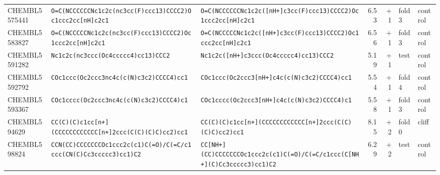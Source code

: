 \begin{longtable}{l p{4.4cm} p{4.4cm} r r l l}
CHEMBL5575441 & \texttt{O=\allowbreak{}C(\allowbreak{}NCCCCCCNc1c2c(\allowbreak{}nc3cc(\allowbreak{}F)\allowbreak{}ccc13)\allowbreak{}CCCC2)\allowbreak{}Oc1ccc2cc[nH]\allowbreak{}c2c1} & \texttt{O=\allowbreak{}C(\allowbreak{}NCCCCCCNc1c2c(\allowbreak{}[nH+]\allowbreak{}c3cc(\allowbreak{}F)\allowbreak{}ccc13)\allowbreak{}CCCC2)\allowbreak{}Oc1ccc2cc[nH]\allowbreak{}c2c1} & 6.53 & +1 & fold 3 & control \\
CHEMBL5583827 & \texttt{O=\allowbreak{}C(\allowbreak{}NCCCCCNc1c2c(\allowbreak{}nc3cc(\allowbreak{}F)\allowbreak{}ccc13)\allowbreak{}CCCC2)\allowbreak{}Oc1ccc2cc[nH]\allowbreak{}c2c1} & \texttt{O=\allowbreak{}C(\allowbreak{}NCCCCCNc1c2c(\allowbreak{}[nH+]\allowbreak{}c3cc(\allowbreak{}F)\allowbreak{}ccc13)\allowbreak{}CCCC2)\allowbreak{}Oc1ccc2cc[nH]\allowbreak{}c2c1} & 6.56 & +1 & fold 3 & control \\
CHEMBL5591282 & \texttt{Nc1c2c(\allowbreak{}nc3ccc(\allowbreak{}Oc4ccccc4)\allowbreak{}cc13)\allowbreak{}CCC2} & \texttt{Nc1c2c(\allowbreak{}[nH+]\allowbreak{}c3ccc(\allowbreak{}Oc4ccccc4)\allowbreak{}cc13)\allowbreak{}CCC2} & 5.19 & +1 & test & control \\
CHEMBL5592792 & \texttt{COc1ccc(\allowbreak{}Oc2ccc3nc4c(\allowbreak{}c(\allowbreak{}N)\allowbreak{}c3c2)\allowbreak{}CCCC4)\allowbreak{}cc1} & \texttt{COc1ccc(\allowbreak{}Oc2ccc3[nH+]\allowbreak{}c4c(\allowbreak{}c(\allowbreak{}N)\allowbreak{}c3c2)\allowbreak{}CCCC4)\allowbreak{}cc1} & 5.54 & +1 & fold 4 & control \\
CHEMBL5593367 & \texttt{COc1cccc(\allowbreak{}Oc2ccc3nc4c(\allowbreak{}c(\allowbreak{}N)\allowbreak{}c3c2)\allowbreak{}CCCC4)\allowbreak{}c1} & \texttt{COc1cccc(\allowbreak{}Oc2ccc3[nH+]\allowbreak{}c4c(\allowbreak{}c(\allowbreak{}N)\allowbreak{}c3c2)\allowbreak{}CCCC4)\allowbreak{}c1} & 5.58 & +1 & fold 3 & control \\
CHEMBL594629 & \texttt{CC(\allowbreak{}C)\allowbreak{}(\allowbreak{}C)\allowbreak{}c1cc[n+]\allowbreak{}(\allowbreak{}CCCCCCCCCCCC[n+]\allowbreak{}2ccc(\allowbreak{}C(\allowbreak{}C)\allowbreak{}(\allowbreak{}C)\allowbreak{}C)\allowbreak{}cc2)\allowbreak{}cc1} & \texttt{CC(\allowbreak{}C)\allowbreak{}(\allowbreak{}C)\allowbreak{}c1cc[n+]\allowbreak{}(\allowbreak{}CCCCCCCCCCCC[n+]\allowbreak{}2ccc(\allowbreak{}C(\allowbreak{}C)\allowbreak{}(\allowbreak{}C)\allowbreak{}C)\allowbreak{}cc2)\allowbreak{}cc1} & 8.15 & +2 & fold 0 & cliff \\
CHEMBL598824 & \texttt{CCN(\allowbreak{}CC)\allowbreak{}CCCCCCCOc1ccc2c(\allowbreak{}c1)\allowbreak{}C(\allowbreak{}=\allowbreak{}O)\allowbreak{}/\allowbreak{}C(\allowbreak{}=\allowbreak{}C/\allowbreak{}c1ccc(\allowbreak{}CN(\allowbreak{}C)\allowbreak{}Cc3ccccc3)\allowbreak{}cc1)\allowbreak{}C2} & \texttt{CC[NH+]\allowbreak{}(\allowbreak{}CC)\allowbreak{}CCCCCCCOc1ccc2c(\allowbreak{}c1)\allowbreak{}C(\allowbreak{}=\allowbreak{}O)\allowbreak{}/\allowbreak{}C(\allowbreak{}=\allowbreak{}C/\allowbreak{}c1ccc(\allowbreak{}C[NH+]\allowbreak{}(\allowbreak{}C)\allowbreak{}Cc3ccccc3)\allowbreak{}cc1)\allowbreak{}C2} & 6.29 & +2 & test & control \\

\end{longtable}
